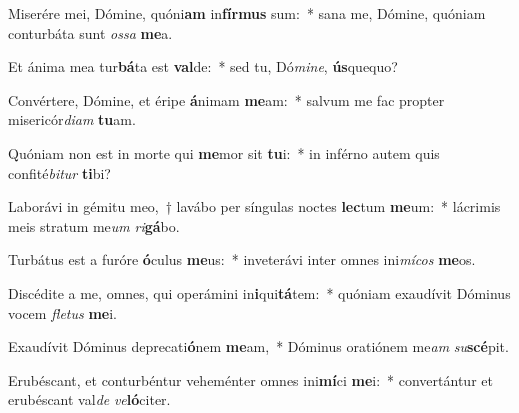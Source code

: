 \item Miserére mei, Dómine, quóni\textbf{am} in\textbf{fír}\textbf{mus} sum:~* sana me, Dómine, quóniam conturbáta sunt \textit{os}\textit{sa} \textbf{me}a.
\item Et ánima mea tur\textbf{bá}ta est \textbf{val}de:~* sed tu, Dó\textit{mi}\textit{ne}, \textbf{ús}quequo?
\item Convértere, Dómine, et éripe \textbf{á}nimam \textbf{me}am:~* salvum me fac propter misericór\textit{di}\textit{am} \textbf{tu}am.
\item Quóniam non est in morte qui \textbf{me}mor sit \textbf{tu}i:~* in inférno autem quis confité\textit{bi}\textit{tur} \textbf{ti}bi?
\item Laborávi in gémitu meo,~† lavábo per síngulas noctes \textbf{lec}tum \textbf{me}um:~* lácrimis meis stratum me\textit{um} \textit{ri}\textbf{gá}bo.
\item Turbátus est a furóre \textbf{ó}culus \textbf{me}us:~* inveterávi inter omnes ini\textit{mí}\textit{cos} \textbf{me}os.
\item Discédite a me, omnes, qui operámini in\textbf{i}qui\textbf{tá}tem:~* quóniam exaudívit Dóminus vocem \textit{fle}\textit{tus} \textbf{me}i.
\item Exaudívit Dóminus deprecati\textbf{ó}nem \textbf{me}am,~* Dóminus oratiónem me\textit{am} \textit{su}\textbf{scé}pit.
\item Erubéscant, et conturbéntur veheménter omnes ini\textbf{mí}ci \textbf{me}i:~* convertántur et erubéscant val\textit{de} \textit{ve}\textbf{ló}citer.
